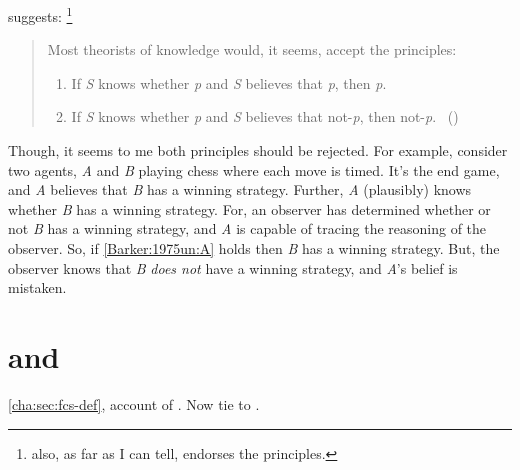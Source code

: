 \begin{note}
  \citeauthor{Barker:1975un} suggests:%
  \footnote{
    \citeauthor{Barker:1975un} also, as far as I can tell, endorses the principles.
  }

  \begin{quote}
    Most theorists of knowledge would, it seems, accept the principles:
    \begin{enumerate}[label=(\Alph*), ref=(\Alph*)]
    \item
      \label{Barker:1975un:A}
      If \emph{S} knows whether \emph{p} and \emph{S} believes that \emph{p}, then \emph{p}.
    \item
      \label{Barker:1975un:B}
      If \emph{S} knows whether \emph{p} and \emph{S} believes that not-\emph{p}, then not-\emph{p}.\newline
      \mbox{ }\hfill\mbox{(\citeyear[281]{Barker:1975un})}
    \end{enumerate}
  \end{quote}
  Though, it seems to me both principles should be rejected.
  For example, consider two agents, \emph{A} and \emph{B} playing chess where each move is timed.
  It's the end game, and \emph{A} believes that \emph{B} has a winning strategy.
  Further, \emph{A} (plausibly) knows whether \emph{B} has a winning strategy.
  For, an observer has determined whether or not \emph{B} has a winning strategy, and \emph{A} is capable of tracing the reasoning of the observer.
  So, if \ref{Barker:1975un:A} holds then \emph{B} has a winning strategy.
  But, the observer knows that \emph{B} \emph{does not} have a winning strategy, and \emph{A}'s belief is mistaken.
\end{note}

\section{ and }
\label{cha:fcs:sec:fcs-support}

\begin{note}
  \autoref{cha:sec:fcs-def}, account of .
  Now tie to .
\end{note}

